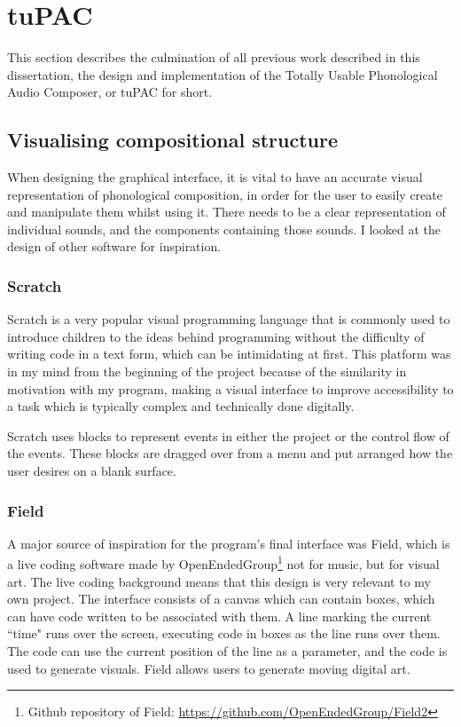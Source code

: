 \documentclass[12pt,a4paper,twoside,openright]{report}
\begin{document}
\section{tuPAC}

This section describes the culmination of all previous work described in this dissertation, the design and implementation of the Totally Usable Phonological Audio Composer, or tuPAC for short.

\subsection{Visualising compositional structure}
When designing the graphical interface, it is vital to have an accurate visual representation of phonological composition, in order for the user to easily create and manipulate them whilst using it. There needs to be a clear representation of individual sounds, and the components containing those sounds. I looked at the design of other software for inspiration.

\subsubsection{Scratch}
Scratch is a very popular visual programming language that is commonly used to introduce children to the ideas behind programming without the difficulty of writing code in a text form, which can be intimidating at first. This platform was in my mind from the beginning of the project because of the similarity in motivation with my program, making a visual interface to improve accessibility to a task which is typically complex and technically done digitally. 

Scratch uses blocks to represent events in either the project or the control flow of the events. These blocks are dragged over from a menu and put arranged how the user desires on a blank surface.

\subsubsection{Field}
A major source of inspiration for the program's final interface was Field, which is a live coding software made by OpenEndedGroup\footnote{Github repository of Field: \url{https://github.com/OpenEndedGroup/Field2}} not for music, but for visual art. The live coding background means that this design is very relevant to my own project. The interface consists of a canvas which can contain boxes, which can have code written to be associated with them. A line marking the current ``time" runs over the screen, executing code in boxes as the line runs over them. The code can use the current position of the line as a parameter, and the code is used to generate visuals. Field allows users to generate moving digital art.
\end{document}
